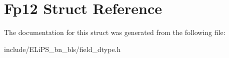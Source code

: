 \hypertarget{struct_fp12}{}\section{Fp12 Struct Reference}
\label{struct_fp12}


The documentation for this struct was generated from the following file\+:\begin{DoxyCompactItemize}
\item 
include/\+E\+Li\+P\+S\+\_\+bn\+\_\+bls/field\+\_\+dtype.\+h\end{DoxyCompactItemize}
